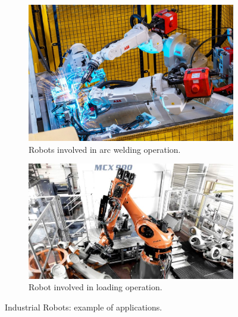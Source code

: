 \begin{figure}[t]
    \centering
    \begin{subfigure}[b]{0.45\textwidth}
        \includegraphics[width=\textwidth]{figures/images/welding.jpg}
        \caption{Robots involved in arc welding operation.}
        \label{fig:welding}
    \end{subfigure}
    \hfill
    \begin{subfigure}[b]{0.5\textwidth}
        \includegraphics[width=\textwidth]{figures/images/loading.jpg}
        \caption{Robot involved in loading operation.}
        \label{fig:material_handling}
    \end{subfigure}
   \hfill
   \caption{Industrial Robots: example of applications.}
   \label{fig:industrial_robots_example}
\end{figure}

